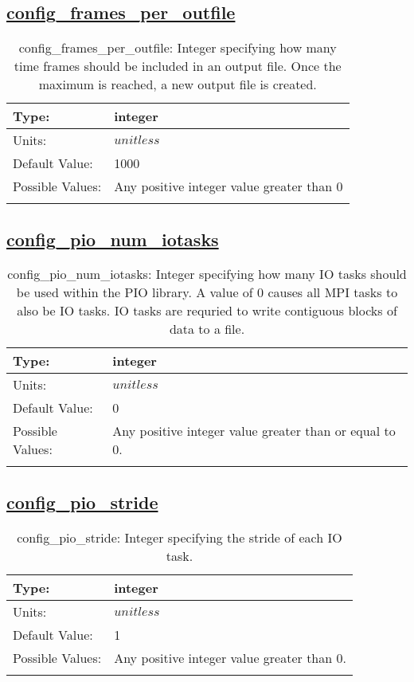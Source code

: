 \subsection[config\_frames\_per\_outfile]{\hyperref[sec:nm_tab_io]{config\_frames\_per\_outfile}}
\label{subsec:nm_sec_config_frames_per_outfile}
\begin{center}
\begin{longtable}{| p{2.0in} | p{4.0in} |}
    \hline
    Type: & integer \\
    \hline
    Units: & $unitless$ \\
    \hline
    Default Value: & 1000 \\
    \hline
    Possible Values: & Any positive integer value greater than 0 \\
    \hline
    \caption{config\_frames\_per\_outfile: Integer specifying how many time frames should be included in an output file. Once the maximum is reached, a new output file is created.}
\end{longtable}
\end{center}
\subsection[config\_pio\_num\_iotasks]{\hyperref[sec:nm_tab_io]{config\_pio\_num\_iotasks}}
\label{subsec:nm_sec_config_pio_num_iotasks}
\begin{center}
\begin{longtable}{| p{2.0in} | p{4.0in} |}
    \hline
    Type: & integer \\
    \hline
    Units: & $unitless$ \\
    \hline
    Default Value: & 0 \\
    \hline
    Possible Values: & Any positive integer value greater than or equal to 0. \\
    \hline
    \caption{config\_pio\_num\_iotasks: Integer specifying how many IO tasks should be used within the PIO library. A value of 0 causes all MPI tasks to also be IO tasks. IO tasks are requried to write contiguous blocks of data to a file.}
\end{longtable}
\end{center}
\subsection[config\_pio\_stride]{\hyperref[sec:nm_tab_io]{config\_pio\_stride}}
\label{subsec:nm_sec_config_pio_stride}
\begin{center}
\begin{longtable}{| p{2.0in} | p{4.0in} |}
    \hline
    Type: & integer \\
    \hline
    Units: & $unitless$ \\
    \hline
    Default Value: & 1 \\
    \hline
    Possible Values: & Any positive integer value greater than 0. \\
    \hline
    \caption{config\_pio\_stride: Integer specifying the stride of each IO task.}
\end{longtable}
\end{center}
